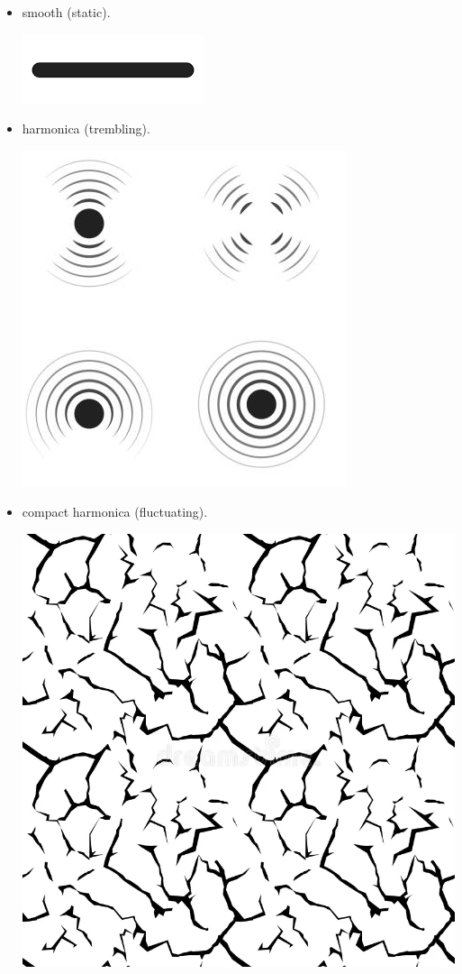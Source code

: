 \begin{itemize}
\begin{itemize}
    \begin{itemize}
    \item smooth (static).
      \begin{center}
      \includegraphics[scale=0.1]{../img/linea.png}
      \end{center}
    \item harmonica (trembling).
      \begin{center}
      \includegraphics[scale=0.45]{../img/tremore.png}
      \end{center}
    \item compact harmonica (fluctuating).
      \begin{center}
      \includegraphics[scale=0.1]{../img/scricchiolio.png}

\end{center}
\end{itemize}
\end{itemize}
\end{itemize}

